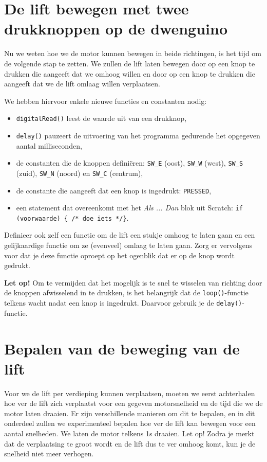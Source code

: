 \documentclass{article}
\begin{document}
\section{De lift bewegen met twee drukknoppen op de dwenguino}

Nu we weten hoe we de motor kunnen bewegen in beide richtingen, is het tijd om de volgende stap te zetten. We zullen
de lift laten bewegen door op een knop te drukken die aangeeft dat we omhoog willen en door op een knop te drukken
die aangeeft dat we de lift omlaag willen verplaatsen.

We hebben hiervoor enkele nieuwe functies en constanten nodig:

\begin{itemize}
\item \texttt{digitalRead()} leest de waarde uit van een drukknop,
\item \texttt{delay()} pauzeert de uitvoering van het programma gedurende het opgegeven aantal milliseconden,
\item de constanten die de knoppen defini\"eren: \texttt{SW\_E} (oost), \texttt{SW\_W} (west), \texttt{SW\_S} (zuid), \texttt{SW\_N} (noord) en \texttt{SW\_C} (centrum),
\item de constante die aangeeft dat een knop is ingedrukt: \texttt{PRESSED},
\item een statement dat overeenkomt met het {\em Als ... Dan} blok uit Scratch: \texttt{if (voorwaarde) \{ /* doe iets */\}}.
\end{itemize}

Definieer ook zelf een functie om de lift een stukje omhoog te laten gaan en een gelijkaardige functie om ze (evenveel)
omlaag te laten gaan. Zorg er vervolgens voor dat je deze functie oproept op het ogenblik dat er op de knop wordt
gedrukt.

\textbf{Let op!} Om te vermijden dat het mogelijk is te snel te wisselen van richting door de knoppen afwisselend in te
drukken, is het belangrijk dat de \texttt{loop()}-functie telkens wacht nadat een knop is ingedrukt. Daarvoor gebruik je
de \texttt{delay()}-functie.

\section{Bepalen van de beweging van de lift}

Voor we de lift per verdieping kunnen verplaatsen, moeten we eerst achterhalen hoe ver de lift zich verplaatst voor
een gegeven motorsnelheid en de tijd die we de motor laten draaien. Er zijn verschillende manieren om dit te bepalen,
en in dit onderdeel zullen we experimenteel bepalen hoe ver de lift kan bewegen voor een aantal snelheden. We laten
de motor telkens 1s draaien. Let op! Zodra je merkt dat de verplaatsing te groot wordt en de lift dus te ver omhoog
komt, kun je de snelheid niet meer verhogen.
\end{document}
